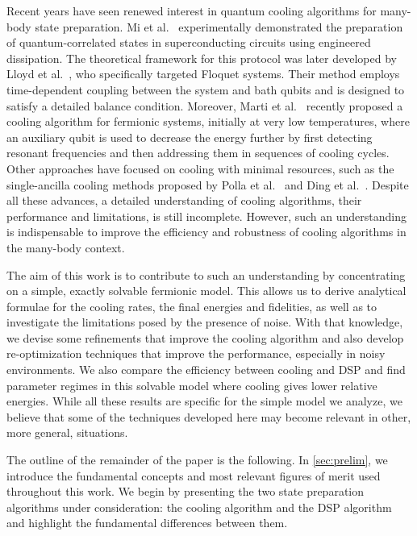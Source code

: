 \documentclass[aps,prx,twocolumn,superscriptaddress,nofootinbib,nolongbibliography,nobalancelastpage,10pt,floatfix]{revtex4-2}
\begin{document}
Recent years have seen renewed interest in quantum cooling algorithms for many-body state preparation. Mi et al.~\cite{Mi2024Stable} experimentally demonstrated the preparation of quantum-correlated states in superconducting circuits using engineered dissipation. The theoretical framework for this protocol was later developed by Lloyd et al.~\cite{Lloyd2025Quasiparticle}, who specifically targeted Floquet systems. Their method employs time-dependent coupling between the system and bath qubits and is designed to satisfy a detailed balance condition. Moreover, Marti et al.~\cite{Marti2025Efficient} recently proposed a cooling algorithm for fermionic systems, initially at very low temperatures, where an auxiliary qubit is used to decrease the energy further by first detecting resonant frequencies and then addressing them in sequences of cooling cycles. Other approaches have focused on cooling with minimal resources, such as the single-ancilla cooling methods proposed by Polla et al.~\cite{Polla2021Quantum} and Ding et al.~\cite{Ding2024Singleancilla}. Despite all these advances, a detailed understanding of cooling algorithms, their performance and limitations, is still incomplete. However, such an understanding is indispensable to improve the efficiency and robustness of cooling algorithms in the many-body context.

The aim of this work is to contribute to such an understanding by concentrating on a simple, exactly solvable fermionic model. This allows us to derive analytical formulae for the cooling rates, the final energies and fidelities, as well as to investigate the limitations posed by the presence of noise. With that knowledge, we devise some refinements that improve the cooling algorithm and also develop re-optimization techniques that improve the performance, especially in noisy environments. We also compare the efficiency between cooling and DSP and find parameter regimes in this solvable model where cooling gives lower relative energies. While all these results are specific for the simple model we analyze, we believe that some of the techniques developed here may become relevant in other, more general, situations.

The outline of the remainder of the paper is the following. In \cref{sec:prelim}, we introduce the fundamental concepts and most relevant figures of merit used throughout this work. We begin by presenting the two state preparation algorithms under consideration: the cooling algorithm and the DSP algorithm and highlight the fundamental differences between them.
\end{document}
